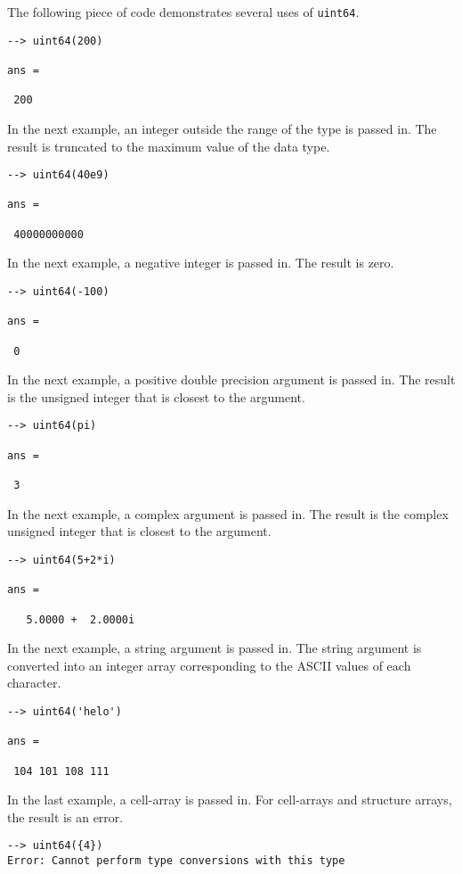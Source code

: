 The following piece of code demonstrates several uses of \verb|uint64|.
\begin{verbatim}
--> uint64(200)

ans = 

 200 
\end{verbatim}
In the next example, an integer outside the range  of the type is passed in.
The result is truncated to the maximum value of the data type.
\begin{verbatim}
--> uint64(40e9)

ans = 

 40000000000 
\end{verbatim}
In the next example, a negative integer is passed in.  The result is zero.
\begin{verbatim}
--> uint64(-100)

ans = 

 0 
\end{verbatim}
In the next example, a positive double precision argument is passed in.  
The result is the unsigned integer that is closest to the argument.
\begin{verbatim}
--> uint64(pi)

ans = 

 3 
\end{verbatim}
In the next example, a complex argument is passed in.  The result is the 
complex unsigned integer that is closest to the argument.
\begin{verbatim}
--> uint64(5+2*i)

ans = 

   5.0000 +  2.0000i 
\end{verbatim}
In the next example, a string argument is passed in.  The string argument is 
converted into an integer array corresponding to the ASCII values of each character.
\begin{verbatim}
--> uint64('helo')

ans = 

 104 101 108 111 
\end{verbatim}
In the last example, a cell-array is passed in.  For cell-arrays and structure 
arrays, the result is an error.
\begin{verbatim}
--> uint64({4})
Error: Cannot perform type conversions with this type
\end{verbatim}
